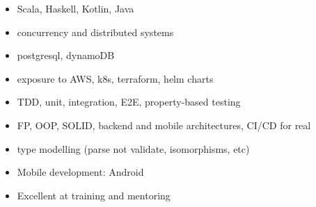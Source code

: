 \setlength{\columnsep}{-1.0cm}
 \begin{multicols}{2}
    \begin{itemize}
	    \item Scala, Haskell, Kotlin, Java
      \item concurrency and distributed systems 
        \item postgresql, dynamoDB
        \item exposure to AWS, k8s, terraform, helm charts 
	    \item TDD, unit, integration, E2E, property-based testing %
	    \item FP, OOP, SOLID, backend and mobile architectures,
	    CI/CD for real 
      \item type modelling (parse not validate, isomorphisms, etc)
        \item Mobile development: Android 
	    \item Excellent at training and mentoring 
    \end{itemize}
 \end{multicols}
